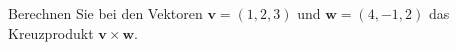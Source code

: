 \question[10] Berechnen Sie bei den Vektoren $\mathbf{v} = (1, 2, 3)$ und $\mathbf{w} = (4, -1, 2)$ das Kreuzprodukt $\mathbf{v} \times \mathbf{w}$.
